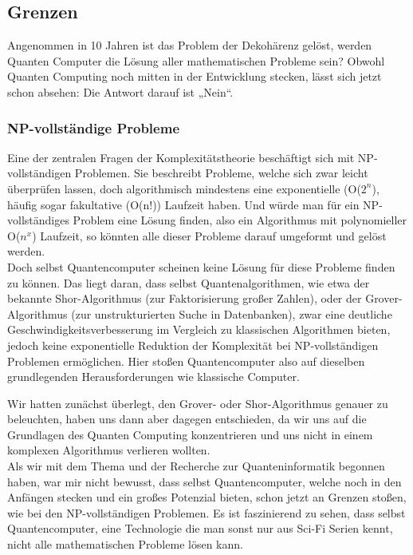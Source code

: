 \subsection{Grenzen}
\label{subsec:grenzen}

Angenommen in 10 Jahren ist das Problem der Dekohärenz gelöst, werden Quanten Computer die Lösung aller mathematischen Probleme sein?
Obwohl Quanten Computing noch mitten in der Entwicklung stecken, lässt sich jetzt schon absehen: Die Antwort darauf ist „Nein“.\\

\subsubsection{NP-vollständige Probleme}
\label{subsubsec:np-vollstaendige-probleme}
Eine der zentralen Fragen der Komplexitätstheorie beschäftigt sich mit NP-vollständigen Problemen.
Sie beschreibt Probleme, welche sich zwar leicht überprüfen lassen, doch algorithmisch mindestens eine exponentielle (O($2^{n}$), häufig sogar fakultative (O(n!)) Laufzeit haben.
Und würde man für ein NP-vollständiges Problem eine Lösung finden, also ein Algorithmus mit polynomieller O($n^{x}$) Laufzeit, so könnten alle dieser Probleme darauf umgeformt und gelöst werden.\\

Doch selbst Quantencomputer scheinen keine Lösung für diese Probleme finden zu können.
Das liegt daran, dass selbst Quantenalgorithmen, wie etwa der bekannte Shor-Algorithmus (zur Faktorisierung großer Zahlen),
oder der Grover-Algorithmus (zur unstrukturierten Suche in Datenbanken), zwar eine deutliche Geschwindigkeitsverbesserung im Vergleich zu klassischen Algorithmen bieten,
jedoch keine exponentielle Reduktion der Komplexität bei NP-vollständigen Problemen ermöglichen.
Hier stoßen Quantencomputer also auf dieselben grundlegenden Herausforderungen wie klassische Computer.\\

\begin{tcolorbox}[title=Kommentar,
    title filled=false,
    colback=cyan!5!white,
    colframe=cyan!75!black]
    Wir hatten zunächst überlegt, den Grover- oder Shor-Algorithmus genauer zu beleuchten, haben uns dann aber dagegen entschieden,
    da wir uns auf die Grundlagen des Quanten Computing konzentrieren und uns nicht in einem komplexen Algorithmus verlieren wollten.\\

    Als wir mit dem Thema und der Recherche zur Quanteninformatik begonnen haben, war mir nicht bewusst, dass selbst Quantencomputer,
    welche noch in den Anfängen stecken und ein großes Potenzial bieten, schon jetzt an Grenzen stoßen, wie bei den NP-vollständigen Problemen.
    Es ist faszinierend zu sehen, dass selbst Quantencomputer, eine Technologie die man sonst nur aus Sci-Fi Serien kennt, nicht alle mathematischen Probleme lösen kann.
\end{tcolorbox}

